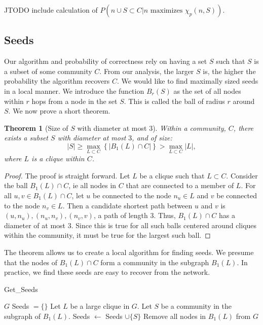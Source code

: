 \documentclass[phd,tocprelim]{cornell}
\newtheorem{theorem}{Theorem}[section]
\newtheorem{proof}[definition]{Proof}
\renewcommand{\caption}[1]{\singlespacing\hangcaption{#1}\normalspacing}
\begin{document}
JTODO include calculation of $P(n \cup S \subset C | n \mbox{ maximizes } \chi_p(n, S))$.


\subsection{Seeds}
\label{sec:seeds}


Our algorithm and probability of correctness rely on having a set $S$ such that $S$ is a subset of some community $C$.  From our analysis, the larger $S$ is, the higher the probability the algorithm recovers $C$.  We would like to find maximally sized seeds in a local manner.  We introduce the function $B_r(S)$ as the set of all nodes within $r$ hops from a node in the set $S$.  This is called the ball of radius $r$ around $S$.  We now prove a short theorem.
\begin{theorem}[Size of $S$ with diameter at most $3$]
Within a community, $C$, there exists a subset $S$ with diameter at most $3$, and of size:
\begin{equation}
 |S| \geq \max_{L \subset C}\left\{| B_1(L) \cap C  | \right\} > \max_{L \subset C} |L|,
\end{equation}
where $L$ is a clique within $C$.
\end{theorem}
\begin{proof}
The proof is straight forward.  Let $L$ be a clique such that $ L \subset C$.  Consider the ball $B_1(L) \cap C$, ie all nodes in $C$ that are connected to a member of $L$.  For all $u, v \in B_1(L) \cap C$, let  $u$ be connected to the node $n_u \in L$ and $v$ be connected to the node $n_v \in L$.  Then a candidate shortest path between $u$ and $v$ is $(u, n_u), (n_u, n_v), (n_v, v)$, a path of length $3$.  Thus, $B_1(L) \cap C$ has a diameter of at most $3$.  Since this is true for all such balls centered around cliques within the community, it must be true for the largest such ball.
\end{proof}
The theorem allows us to create a local algorithm for finding seeds.  We presume that the nodes of $B_1(L) \cap C$ form a community in the subgraph $B_1(L)$.  In practice, we find these seeds are easy to recover from the network.
\begin{algorithm}[!h]                              %
\caption{{\sc Get\_Seeds}}         %
\label{alg:seed}                                   %
\begin{algorithmic}                        %
\REQUIRE $G$
\STATE Seeds $= \{\}$
\STATE Let $L$ be a large clique in $G$.
\STATE Let $S$ be a community in the subgraph of $B_1(L)$.
\STATE Seeds $\leftarrow$ Seeds $\cup \{S\}$
\STATE Remove all nodes in $B_1(L)$ from $G$
\ENDWHILE
{}
\end{algorithmic}
\end{algorithm}
\end{document}
